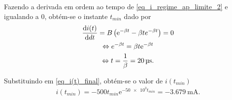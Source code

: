 \documentclass[a4paper, titlepage, portuguese]{article}
\newcommand{\eq}{\Leftrightarrow} %
\newcommand\e{\mathrm{e} }
\begin{document}
		Fazendo a derivada em ordem ao tempo de \eqref{eq_i_regime_ap_limite_2} e igualando a 0, obtém-se o instante $t_{min}$ dado por
		\begin{gather*}
			\dv{i(t)}{dt} = B\left( \e^{-\beta t} - \beta t e^{-\beta t}\right) = 0 \\ \eq
			e^{-\beta t} = \beta t\e^{-\beta t} \\ \eq
			t = \frac{1}{\beta} = \SI{20}{\micro\second}.
		\end{gather*}
		
		Substituindo em \eqref{eq_i(t)_final}, obtém-se o valor de $i(t_{min})$
		\begin{gather*}
			i(t_{min}) = -500t_{min}\e^{-\num{50e3}t_{min}} = \SI{-3.679}{\milli\ampere}.
		\end{gather*}
		

\end{document}
